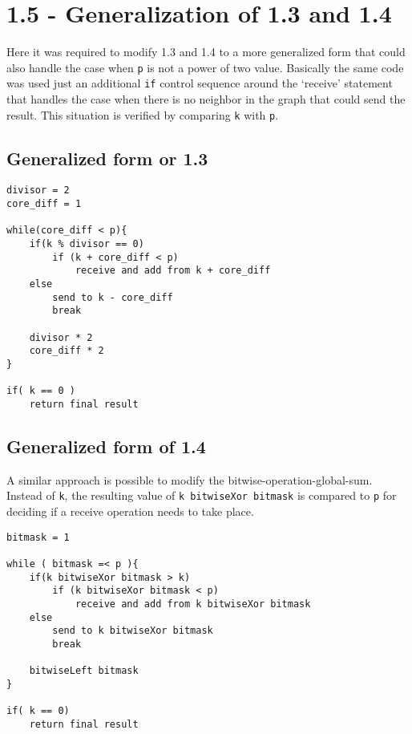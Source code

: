 \documentclass[a4paper,11pt,twoside]{article}
\begin{document}
\section{1.5 - Generalization of 1.3 and 1.4}
Here it was required to modify 1.3 and 1.4 to a more generalized form that could also handle the case when \verb+p+ is not a power of two value.
Basically the same code was used just an additional \verb+if+ control sequence around the `receive' statement that handles the case when there is no neighbor in the graph that could send the result. This situation is verified by comparing \verb+k+ with \verb+p+.  


\subsection{Generalized form or 1.3}
\begin{verbatim}
divisor = 2
core_diff = 1

while(core_diff < p){
    if(k % divisor == 0)
        if (k + core_diff < p)  
            receive and add from k + core_diff
    else 
        send to k - core_diff
        break

    divisor * 2
    core_diff * 2
}

if( k == 0 )
    return final result
\end{verbatim}

\subsection{Generalized form of 1.4}
A similar approach is possible to modify the bitwise-operation-global-sum. Instead of \verb+k+, the resulting value of \verb+k bitwiseXor bitmask+ is compared to \verb+p+ for deciding if a receive operation needs to take place.

\begin{verbatim}
bitmask = 1

while ( bitmask =< p ){
    if(k bitwiseXor bitmask > k)
        if (k bitwiseXor bitmask < p)
            receive and add from k bitwiseXor bitmask
    else
        send to k bitwiseXor bitmask
        break

    bitwiseLeft bitmask
}

if( k == 0)
    return final result
\end{verbatim}
\end{document}
